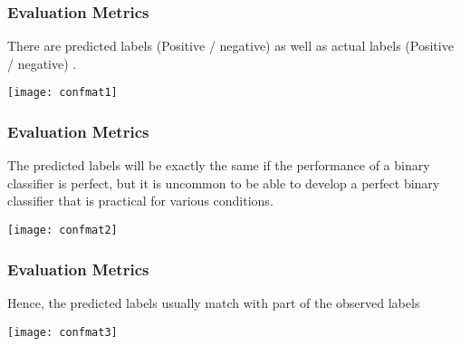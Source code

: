 \begin{frame}[fragile]\frametitle{Evaluation Metrics}
There are predicted labels (Positive / negative) as well as actual labels (Positive / negative) .
\begin{center}
\texttt{[image: confmat1]}
\end{center}

\end{frame}

\begin{frame}[fragile]\frametitle{Evaluation Metrics}
The predicted labels will be exactly the same if the performance of a binary
classifier is perfect, but it is uncommon to be able to develop a perfect binary
classifier that is practical for various conditions.
\begin{center}
\texttt{[image: confmat2]}
\end{center}

\end{frame}

\begin{frame}[fragile]\frametitle{Evaluation Metrics}
Hence, the predicted labels usually match with part of the observed labels
\begin{center}
\texttt{[image: confmat3]}
\end{center}

\end{frame}
%
%

